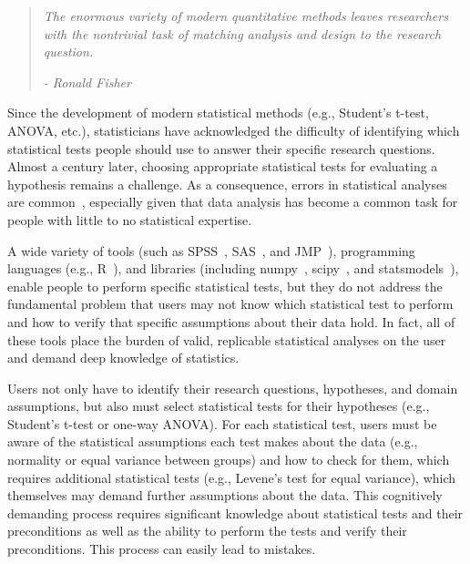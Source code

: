 \begin{flushright}
    \begin{quote}
        \textit{
        The enormous variety of modern quantitative methods leaves researchers with the
        nontrivial task of matching analysis and design to the research question.} \\ 
        \vspace{-10pt}
        \begin{flushright}
            \textit{                                 - Ronald Fisher~\cite{fisher1937design}}
        \end{flushright}
    \end{quote}
\end{flushright}
    
Since the development of modern statistical methods (e.g., Student's t-test,
ANOVA, etc.), statisticians have acknowledged the difficulty of identifying
which statistical tests people should use to answer their specific research
questions. Almost a century later, choosing appropriate statistical tests for
evaluating a hypothesis remains a challenge. As a consequence, errors in
statistical analyses are common~\cite{kaptein2012rethinking}, especially given
that data analysis has become a common task for people with little to no
statistical expertise.

A wide variety of tools (such as SPSS~\cite{wiki:spss}, SAS~\cite{wiki:sas}, and
JMP~\cite{wiki:jmp}), programming languages (e.g., R~\cite{wiki:r-language}),
and libraries (including numpy~\cite{oliphant2006numpy}, scipy~\cite{scipy}, and
statsmodels~\cite{seabold2010statsmodels}), enable people to perform specific
statistical tests, but they do not address the fundamental problem that users
may not know which statistical test to perform and how to verify that specific
assumptions about their data hold. In fact, all of these tools place the burden
of valid, replicable statistical analyses on the user and demand deep knowledge
of statistics.

Users not only have to identify their research questions, hypotheses, and domain
assumptions, but also must select statistical tests for their hypotheses (e.g.,
Student's t-test or one-way ANOVA). For each statistical test, users must be
aware of the statistical assumptions each test makes about the data (e.g.,
normality or equal variance between groups) and how to check for them, which
requires additional statistical tests (e.g., Levene's test for equal variance),
which themselves may demand further assumptions about the data. This cognitively
demanding process requires significant knowledge about statistical tests
and their preconditions as well as the ability to perform the tests and verify their
preconditions. This process can easily lead to mistakes.

